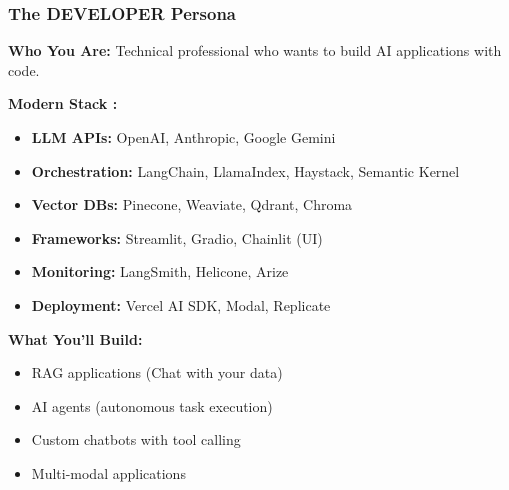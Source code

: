			
  
  


\begin{frame}[fragile]\frametitle{The DEVELOPER Persona }

\textbf{Who You Are:}
Technical professional who wants to build AI applications with code.

\textbf{Modern Stack :}
\begin{itemize}
\item \textbf{LLM APIs:} OpenAI, Anthropic, Google Gemini
\item \textbf{Orchestration:} LangChain, LlamaIndex, Haystack, Semantic Kernel
\item \textbf{Vector DBs:} Pinecone, Weaviate, Qdrant, Chroma
\item \textbf{Frameworks:} Streamlit, Gradio, Chainlit (UI)
\item \textbf{Monitoring:} LangSmith, Helicone, Arize
\item \textbf{Deployment:} Vercel AI SDK, Modal, Replicate
\end{itemize}


\textbf{What You'll Build:}
\begin{itemize}
\item RAG applications (Chat with your data)
\item AI agents (autonomous task execution)
\item Custom chatbots with tool calling
\item Multi-modal applications
\end{itemize}

\end{frame}

